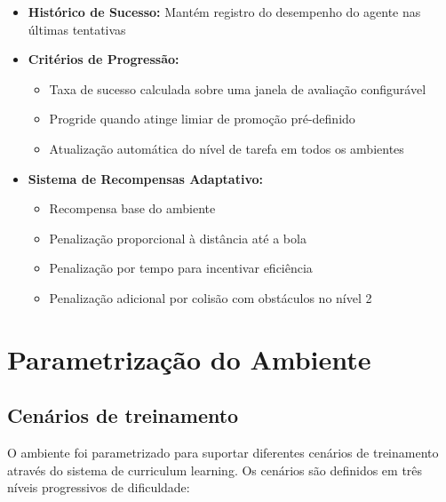 \begin{itemize}
    \item \textbf{Histórico de Sucesso:} Mantém registro do desempenho do agente nas últimas tentativas

    \item \textbf{Critérios de Progressão:}
    \begin{itemize}
        \item Taxa de sucesso calculada sobre uma janela de avaliação configurável
        \item Progride quando atinge limiar de promoção pré-definido
        \item Atualização automática do nível de tarefa em todos os ambientes
    \end{itemize}

    \item \textbf{Sistema de Recompensas Adaptativo:}
    \begin{itemize}
        \item Recompensa base do ambiente
        \item Penalização proporcional à distância até a bola
        \item Penalização por tempo para incentivar eficiência
        \item Penalização adicional por colisão com obstáculos no nível 2
    \end{itemize}
\end{itemize}




\section{Parametrização do Ambiente}

\subsection{Cenários de treinamento}
O ambiente foi parametrizado para suportar diferentes cenários de treinamento através do sistema de curriculum learning. Os cenários são definidos em três níveis progressivos de dificuldade:

